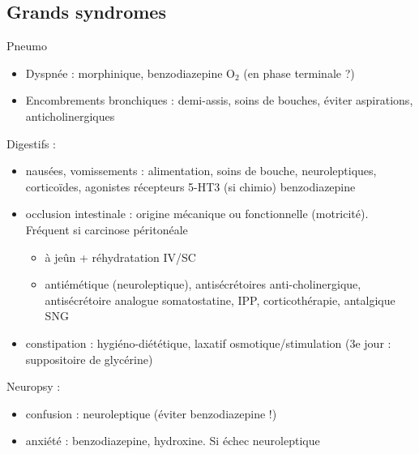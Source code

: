 \documentclass[11pt]{article}
\begin{document}
\printglossaries

\subsection{Grands syndromes}
\label{sec:org99fc91d}
Pneumo 
\begin{itemize}
\item Dyspnée : morphinique, benzodiazepine \textpm{} O\(_{\text{2}}\) (en phase terminale ?)
\item Encombrements bronchiques : demi-assis, soins de bouches, éviter aspirations,
anticholinergiques
\end{itemize}

Digestifs :
\begin{itemize}
\item nausées, vomissements : alimentation, soins de bouche, neuroleptiques,
corticoïdes, agonistes récepteurs 5-HT3 (si chimio) \textpm{} benzodiazepine
\item occlusion intestinale : origine mécanique ou fonctionnelle
(motricité). Fréquent si carcinose péritonéale
\begin{itemize}
\item à jeûn + réhydratation IV/SC
\item antiémétique (neuroleptique), antisécrétoires anti-cholinergique,
antisécrétoire analogue somatostatine, IPP, corticothérapie, antalgique \textpm{}
SNG
\end{itemize}
\item constipation : hygiéno-diététique, laxatif osmotique/stimulation (3e jour :
suppositoire de glycérine)
\end{itemize}

Neuropsy :
\begin{itemize}
\item confusion : neuroleptique (éviter benzodiazepine !)
\item anxiété : benzodiazepine, hydroxine. Si échec neuroleptique
\end{itemize}
\end{document}
